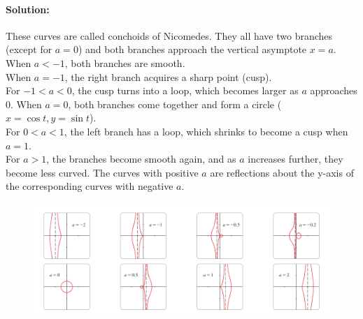 \documentclass{article}
\begin{document}
\paragraph{Solution:} These curves are called conchoids of Nicomedes. They all have two branches (except for $a=0$) and both branches approach the vertical asymptote $x=a$.
\\When $a < -1$, both branches are smooth.\\ When $a=-1$, the right branch acquires a sharp point (cusp). 
\\For $-1 < a < 0$, the cusp turns into a loop, which becomes larger as $a$ approaches $0$. When $a=0$, both branches come together and form a circle ($x=\cos t, y=\sin t$). 
\\For $0 < a < 1$, the left branch has a loop, which shrinks to become a cusp when $a=1$. 
\\For $a>1$, the branches become smooth again, and as $a$ increases further, they become less curved. The curves with positive $a$ are reflections about the y-axis of the corresponding curves with negative $a$.
\begin{figure}[htbp]
    \centering
    \includegraphics[width=1\textwidth]{graph17.png}
\end{figure}
\end{document}
